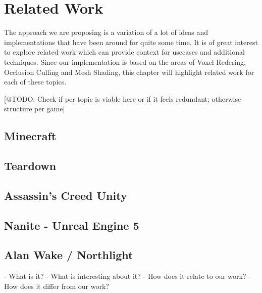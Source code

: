 \chapter{Related Work} \label{cpt-related-work}

The approach we are proposing is a variation of a lot of ideas and implementations that have been 
around for quite some time. It is of great interest to explore related work which can provide 
context for usecases and additional techniques. Since our implementation is based on the areas 
of Voxel Redering, Occlusion Culling and Mesh Shading, this chapter will highlight related work 
for each of these topics. 


[@TODO: Check if per topic is viable here or if it feels redundant; otherwise structure per game]

\section{Minecraft}

\section{Teardown}

\section{Assassin's Creed Unity}

\section{Nanite - Unreal Engine 5}

\section{Alan Wake / Northlight}





- What is it?
- What is interesting about it?
- How does it relate to our work?
- How does it differ from our work?
